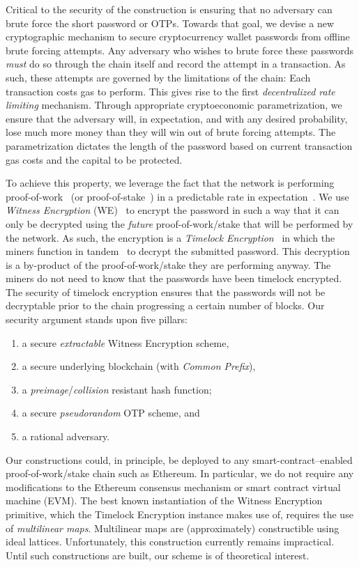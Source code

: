 Critical to the security of the construction is ensuring that no adversary can
brute force the short password or OTPs.
Towards that goal, we devise a new cryptographic mechanism to secure cryptocurrency
wallet passwords from offline brute forcing attempts. Any adversary who wishes
to brute force these passwords \emph{must} do so through the chain itself and
record the attempt in a transaction. As such, these attempts are governed by
the limitations of the chain: Each transaction costs gas to perform. This
gives rise to the first \emph{decentralized rate limiting} mechanism. Through
appropriate cryptoeconomic parametrization, we ensure that the adversary will,
in expectation, and with any desired probability, lose much more money than they
will win out of brute forcing attempts. The parametrization dictates the length
of the password based on current transaction gas costs and the capital to be
protected.

To achieve this property, we leverage the fact that the network is performing
proof-of-work~\cite{pow} (or proof-of-stake~\cite{ouroboros}) in a predictable rate in expectation~\cite{bitcoin-sok}. We use \emph{Witness Encryption}
(WE)~\cite{STOC:GGSW13} to encrypt
the password in such a way that it can only be decrypted using the \emph{future}
proof-of-work/stake that will be performed by the network. As such, the encryption
is a \emph{Timelock Encryption}~\cite{timelock} in which the miners function in tandem~\cite{timelock-bitcoin} to
decrypt the submitted password. This decryption is a by-product of
the proof-of-work/stake they are performing anyway. The miners do not need to know that the
passwords have been timelock encrypted. The security of timelock encryption
ensures that the passwords will not be decryptable prior to the chain progressing
a certain number of blocks. Our security argument stands upon five pillars:

\begin{enumerate}
      \item a secure \emph{extractable} Witness Encryption scheme,
      \item a secure underlying blockchain (with \emph{Common Prefix}),
      \item a \emph{preimage}/\emph{collision} resistant hash function;
      \item a secure \emph{pseudorandom} OTP scheme, and
      \item a rational adversary.
\end{enumerate}

Our constructions could, in principle, be deployed to any smart-contract--enabled
proof-of-work/stake chain such as Ethereum. In particular, we do not require any modifications
to the Ethereum consensus mechanism or smart contract virtual machine (EVM). The
best known instantiation of the Witness Encryption primitive, which the Timelock Encryption
instance makes use of, requires the use of \emph{multilinear maps}.
Multilinear maps are (approximately) constructible using ideal lattices.
Unfortunately, this construction currently remains impractical.
Until such constructions are built, our scheme is of theoretical interest.

